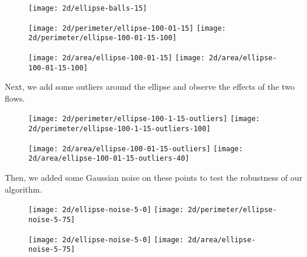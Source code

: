 \begin{figure}[H]
    \centering

    \texttt{[image: 2d/ellipse-balls-15]}

    \texttt{[image: 2d/perimeter/ellipse-100-01-15]}
    \texttt{[image: 2d/perimeter/ellipse-100-01-15-100]}
    \label{fig:ellipse_perimeter_flow}

    \texttt{[image: 2d/area/ellipse-100-01-15]}
    \texttt{[image: 2d/area/ellipse-100-01-15-100]}
    \label{fig:ellipse_area_flow}
\end{figure}
\vspace{-1em}

Next, we add some outliers around the ellipse and observe the effects of the two
flows.

\begin{figure}[H]
    \centering

    \texttt{[image: 2d/perimeter/ellipse-100-1-15-outliers]}
    \texttt{[image: 2d/perimeter/ellipse-100-1-15-outliers-100]}
    \label{fig:ellipse_outliers_perimeter_flow}

    \texttt{[image: 2d/area/ellipse-100-01-15-outliers]}
    \texttt{[image: 2d/area/ellipse-100-01-15-outliers-40]}
    \label{fig:ellipse_outliers_area_flow}
\end{figure}

Then, we added some Gaussian noise on these points to test the robustness of our
algorithm.

\begin{figure}[H]
    \centering

    \texttt{[image: 2d/ellipse-noise-5-0]}
    \texttt{[image: 2d/perimeter/ellipse-noise-5-75]}
    \label{fig:ellipse_noise_perimeter_flow}

    \texttt{[image: 2d/ellipse-noise-5-0]}
    \texttt{[image: 2d/area/ellipse-noise-5-75]}
    \label{fig:ellipse_noise_area_flow}
\end{figure}

